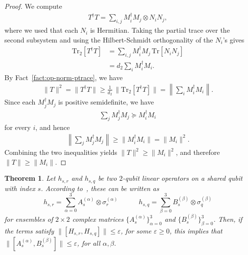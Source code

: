 \documentclass[a4paper,onecolumn,11pt]{quantumarticle}
\theoremstyle{plain}
\newtheorem{theorem}{Theorem}[section]
\newcommand{\eps}{\varepsilon}
\begin{document}
\begin{proof}
We compute
\begin{align}
    T^\dagger T
    = \sum_{i,j} M_i^\dagger M_j \otimes N_i N_j,
\end{align}
where we used that each $N_i$ is Hermitian.  Taking the partial trace over
the second subsystem and using the Hilbert-Schmidt orthogonality of the
$N_i$'s gives
\begin{align}
    \mathrm{Tr}_2[T^\dagger T]
    &= \sum_{i,j} M_i^\dagger M_j \, \mathrm{Tr}[N_i N_j] \\
    &= d_2 \sum_i M_i^\dagger M_i .
\end{align}
By Fact~\ref{fact:op-norm-ptrace}, we have
\begin{align}
    \|T\|^2
    = \|T^\dagger T\|
    \geq \frac{1}{d_2}\,\bigl\|\mathrm{Tr}_2[T^\dagger T]\bigr\|
    = \left\|\sum_i M_i^\dagger M_i\right\|.
\end{align}
Since each $M_j^\dagger M_j$ is positive semidefinite, we have
\begin{align}
    \sum_j M_j^\dagger M_j \succeq M_i^\dagger M_i
\end{align}
for every $i$, and hence
\begin{align}
    \left\|\sum_j M_j^\dagger M_j\right\|
    \geq \|M_i^\dagger M_i\|
    = \|M_i\|^2 .
\end{align}
Combining the two inequalities yields $\|T\|^2 \geq \|M_i\|^2$, and
therefore $\|T\| \geq \|M_i\|$.
\end{proof}
\begin{theorem}\label{thm:comm-propagates-down}
Let $h_{s,r}$ and $h_{s,q}$ be two $2$-qubit linear operators on a shared qubit with index $s$. According to~, these can be written as
\begin{equation}
        h_{s,r} = \sum\limits_{\alpha = 0}^{3} A_s^{(\alpha)} \otimes \sigma_r^{(\alpha)} \quad\quad\quad h_{s,q} = \sum\limits_{\beta = 0}^{3} B_s^{(\beta)} \otimes \sigma_q^{(\beta)}
    \end{equation}
for ensembles of $2 \times 2$ complex matrices $\{A_s^{(\alpha)}\}_{\alpha=0}^3$ and $\{B_s^{(\beta)}\}_{\beta=0}^3$.
Then, if the terms satisfy $\|[H_{s, r}, H_{s, q}]\| \leq \eps$, for some $\eps \geq 0$, this implies that $\|[A_s^{(\alpha)}, B_s^{(\beta)}]\| \leq \eps$, for all $\alpha, \beta$.
\end{theorem}
\end{document}
